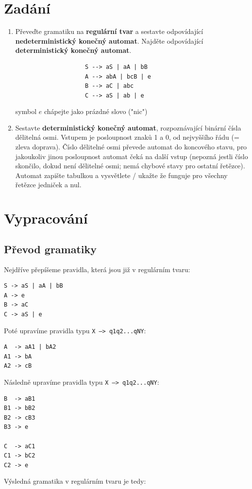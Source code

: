 \documentclass[12pt, a4paper]{article}
\let\oldsection\section
\renewcommand\section{\clearpage\oldsection}
\begin{document}
    \section{Zadání}
    \begin{enumerate}
        \item Převeďte gramatiku na \textbf{regulární tvar} a sestavte odpovídající \textbf{nedeterministický konečný automat}. Najděte odpovídající \textbf{deterministický konečný automat}.

    \begin{lstlisting}
                    S --> aS | aA | bB
                    A --> abA | bcB | e
                    B --> aC | abc
                    C --> aS | ab | e
    \end{lstlisting}

    symbol $e$ chápejte jako prázdné slovo ("nic")

        \item Sestavte \textbf{deterministický konečný automat}, rozpoznávající binární čísla dělitelná osmi. Vstupem je posloupnost znaků 1 a 0, od nejvyššího řádu (= zleva doprava). Číslo dělitelné osmi převede automat do koncového stavu, pro jakoukoliv jinou posloupnost automat čeká na další vstup (nepozná jestli číslo skončilo, dokud není dělitelné osmi; nemá chybové stavy pro ostatní řetězce). Automat zapište tabulkou a vysvětlete / ukažte že funguje pro všechny řetězce jedniček a nul.
   
    \end{enumerate} 

    \section{Vypracování}
        \subsection{Převod gramatiky}
Nejdříve přepíšeme pravidla, která jsou již v regulárním tvaru:
\begin{lstlisting}
S -> aS | aA | bB
A -> e
B -> aC
C -> aS | e
\end{lstlisting}	
Poté upravíme pravidla typu \texttt{X --> q1q2...qNY}:

\begin{lstlisting}
A  -> aA1 | bA2
A1 -> bA
A2 -> cB
\end{lstlisting}	
Následně upravíme pravidla typu \texttt{X --> q1q2...qNY}:

\begin{lstlisting}
B  -> aB1
B1 -> bB2
B2 -> cB3
B3 -> e

C  -> aC1
C1 -> bC2
C2 -> e
\end{lstlisting}	
Výsledná gramatika v regulárním tvaru je tedy:
\end{document}
